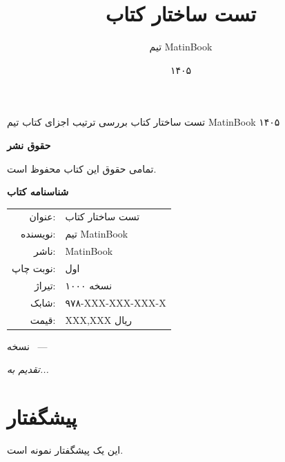 \documentclass{matinbook}
\title{تست ساختار کتاب}
\author{تیم MatinBook}
\date{۱۴۰۵}
\begin{document}
\makecover
    {تست ساختار کتاب}
    {بررسی ترتیب اجزای کتاب}
    {تیم MatinBook}
    {۱۴۰۵}

\frontmatter

\maketitle

\thispagestyle{empty}
\vfill
\begin{center}
    {\large\textbf{حقوق نشر}}
    
    \vspace{1cm}
    تمامی حقوق این کتاب محفوظ است.
    
    \vspace{1cm}
    \textbf{شناسنامه کتاب}
    
    \vspace{0.5cm}
    \begin{tabular}{rl}
        عنوان: & تست ساختار کتاب \\
        نویسنده: & تیم MatinBook \\
        ناشر: & MatinBook \\
        نوبت چاپ: & اول \\
        تیراژ: & ۱۰۰۰ نسخه \\
        شابک: & ۹۷۸-XXX-XXX-XXX-X \\
        قیمت: & XXX,XXX ریال \\
    \end{tabular}
    
    \vspace{1cm}
    {\small نسخه \matinbookversion\ — \matinbookdate}
\end{center}
\clearpage

\thispagestyle{empty}
\vfill
\begin{flushright}
    {\Large\itshape
        تقدیم به...
    }
\end{flushright}
\clearpage

\chapter*{پیشگفتار}

این یک پیشگفتار نمونه است.

\clearpage
\end{document}
